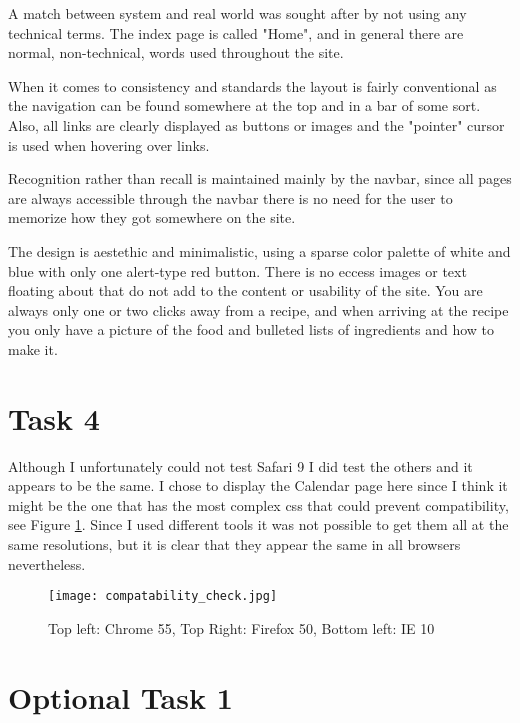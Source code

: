 \documentclass[a4paper]{scrreprt}
\begin{document}
A match between system and real world was sought after by not using any technical terms. The index page is called "Home", and in general there are normal, non-technical, words used throughout the site.

When it comes to consistency and standards the layout is fairly conventional as the navigation can be found somewhere at the top and in a bar of some sort. Also, all links are clearly displayed as buttons or images and the "pointer" cursor is used when hovering over links.

Recognition rather than recall is maintained mainly by the navbar, since all pages are always accessible through the navbar there is no need for the user to memorize how they got somewhere on the site.

The design is aestethic and minimalistic, using a sparse color palette of white and blue with only one alert-type red button. There is no eccess images or text floating about that do not add to the content or usability of the site. You are always only one or two clicks away from a recipe, and when arriving at the recipe you only have a picture of the food and bulleted lists of ingredients and how to make it.

\section{Task 4}

Although I unfortunately could not test Safari 9 I did test the others and it appears to be the same. I chose to display the Calendar page here since I think it might be the one that has the most complex css that could prevent compatibility, see Figure \ref{fig:compcheck}. Since I used different tools it was not possible to get them all at the same resolutions, but it is clear that they appear the same in all browsers nevertheless.

\begin{figure}[h!]
  \begin{center}
    \texttt{[image: compatability\_check.jpg]}
    \caption{Top left: Chrome 55, Top Right: Firefox 50, Bottom left: IE 10}
    \label{fig:compcheck}
  \end{center}
\end{figure}

\section{Optional Task 1}
\end{document}
